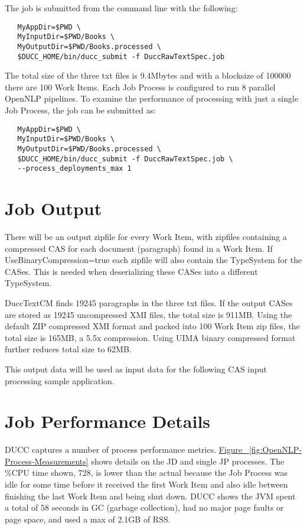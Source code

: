 The job is submitted from the command line with the following:
\begin{verbatim}
   MyAppDir=$PWD \
   MyInputDir=$PWD/Books \
   MyOutputDir=$PWD/Books.processed \
   $DUCC_HOME/bin/ducc_submit -f DuccRawTextSpec.job
\end{verbatim}

The total size of the three txt files is 9.4Mbytes and with a blocksize of 100000 there are 100 Work Items. Each Job Process is 
configured to run 8 parallel OpenNLP pipelines. To examine the performance of processing with just a single Job Process, 
the job can be submitted as:

\begin{verbatim}
   MyAppDir=$PWD \
   MyInputDir=$PWD/Books \
   MyOutputDir=$PWD/Books.processed \
   $DUCC_HOME/bin/ducc_submit -f DuccRawTextSpec.job \
   --process_deployments_max 1
\end{verbatim}

\section{Job Output}
There will be an output zipfile for every Work Item, with zipfiles containing a compressed CAS for each document (paragraph) 
found in a Work Item. If UseBinaryCompression=true each zipfile will also contain the TypeSystem for the CASes. 
This is needed when deserializing these CASes into a different TypeSystem.

DuccTextCM finds 19245 paragraphs in the three txt files. If the output CASes are stored as 19245 uncompressed XMI files, the total size is 911MB. Using the default ZIP compressed XMI format and packed into 100 Work Item zip files, the total size is 165MB, a 5.5x compression. Using UIMA binary compressed format further reduces total size to 62MB.

This output data will be used as input data for the following CAS input processing sample application.

\section{Job Performance Details}
DUCC captures a number of process performance metrics.
\hyperref[fig:OpenNLP-Process-Measurements]{Figure ~\ref{fig:OpenNLP-Process-Measurements}} shows details on the JD and 
single JP processes. The \%CPU time shown, 728, is lower than the actual because the Job Process was idle 
for some time before it received the first Work Item and also idle between finishing the last Work Item and being shut down.
DUCC shows the JVM spent a total of 58 seconds in 
GC (garbage collection), had no major page faults or page space, and used a max of 2.1GB of RSS.

